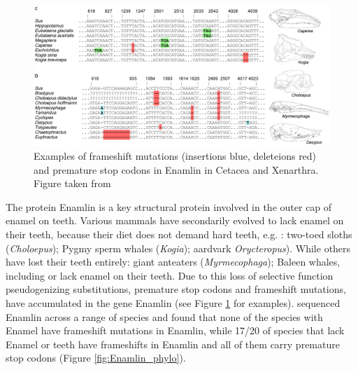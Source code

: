 \begin{figure}
\begin{center}
\includegraphics[width=\textwidth]{Journal_figs/genetic_drift/Enamelin/Enamlin.pdf}
\end{center}
\caption{Examples of frameshift mutations (insertions blue, deleteions
  red) and premature stop codons in Enamlin in Cetacea and
  Xenarthra. Figure taken from \citeauthor{Meredith:09}} \label{fig:Enamlin_coding}  
\end{figure} 


The protein Enamlin is a key structural protein involved in the outer cap of enamel on teeth. Various mammals have
secondarily evolved to lack enamel on their teeth, because their diet does not
demand hard teeth, e.g. : two-toed sloths ({\it Choloepus}); Pygmy sperm whales ({\it Kogia}); aardvark 
{\it Orycteropus}). While others have lost their teeth entirely: giant anteaters ({\it Myrmecophaga}); Baleen whales, including 
or lack enamel on their teeth.
Due to this loss of selective function
pseudogenizing substitutions, premature stop codons and frameshift mutations, have
accumulated in the gene Enamlin (see Figure \ref{fig:Enamlin_coding}
for examples).  \citeauthor{Meredith:09} sequenced Enamlin across a
range of species and found that none of the species with Enamel have frameshift
mutations in Enamlin, while 17/20 of species that lack Enamel or teeth have
frameshifts in Enamlin and all of them carry premature stop codons
(Figure \ref{fig:Enamlin_phylo}). 

